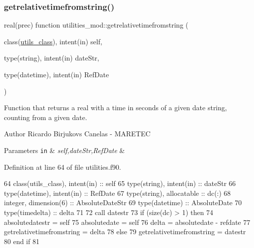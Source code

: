 \subsubsection{\texorpdfstring{getrelativetimefromstring()}{getrelativetimefromstring()}}
{\footnotesize\ttfamily real(prec) function utilities\+\_\+mod\+::getrelativetimefromstring (\begin{DoxyParamCaption}\item[{class(\mbox{\hyperlink{structutilities__mod_1_1utils__class}{utils\+\_\+class}}), intent(in)}]{self,  }\item[{type(string), intent(in)}]{date\+Str,  }\item[{type(datetime), intent(in)}]{Ref\+Date }\end{DoxyParamCaption})\hspace{0.3cm}{\ttfamily [private]}}



Function that returns a real with a time in seconds of a given date string, counting from a given date. 

\begin{DoxyAuthor}{Author}
Ricardo Birjukovs Canelas -\/ M\+A\+R\+E\+T\+EC 
\end{DoxyAuthor}

\begin{DoxyParams}[1]{Parameters}
\mbox{\tt in}  & {\em self,date\+Str,Ref\+Date} & \\
\hline
\end{DoxyParams}


Definition at line 64 of file utilities.\+f90.


\begin{DoxyCode}
64     \textcolor{keywordtype}{class}(utils\_class), \textcolor{keywordtype}{intent(in)} :: self
65     \textcolor{keywordtype}{type}(string), \textcolor{keywordtype}{intent(in)} :: dateStr
66     \textcolor{keywordtype}{type}(datetime), \textcolor{keywordtype}{intent(in)} :: RefDate
67     \textcolor{keywordtype}{type}(string), \textcolor{keywordtype}{allocatable} :: dc(:)
68     \textcolor{keywordtype}{integer}, \textcolor{keywordtype}{dimension(6)} :: AbsoluteDateStr
69     \textcolor{keywordtype}{type}(datetime) :: AbsoluteDate
70     \textcolor{keywordtype}{type}(timedelta) :: delta
71 
72     \textcolor{keyword}{call }datestr%
73     \textcolor{keywordflow}{if} (\textcolor{keyword}{size}(dc) > 1) \textcolor{keywordflow}{then}
74         absolutedatestr = self%
75         absolutedate = self%
76         delta = absolutedate - refdate
77         getrelativetimefromstring = delta%
78     \textcolor{keywordflow}{else}
79         getrelativetimefromstring = datestr%
80 \textcolor{keywordflow}{    end if}
81 
\end{DoxyCode}
\mbox{\label{namespaceutilities__mod_a6ba00b0a503f26c7e755d1efbbe83c5b}} 
